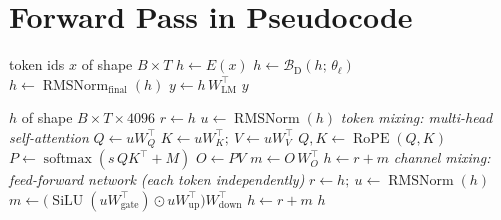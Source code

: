 \documentclass[10pt,a4paper]{article}
\newcommand{\op}[1]{\operatorname{#1}}
\theoremstyle{definition}
\begin{document}
\section{Forward Pass in Pseudocode}\label{sec:algo}
\begin{algorithm}[H]
\caption{Llama-3.1-8B-Instruct: full forward pass}
\begin{algorithmic}[1]
\Require token ids $x$ of shape $B\times T$
\State $h \gets E(x)$ 
 
\State $h \gets \mathcal{B}_{\mathrm{D}}(h;\,\theta_\ell)$ 
\EndFor
\State $h \gets \op{RMSNorm}_{\mathrm{final}}(h)$ 
\State $y \gets h\,W_{\mathrm{LM}}^{\top}$ 
\State \Return $y$ 
\end{algorithmic}
\end{algorithm}
\begin{algorithm}[H]
\caption{Block $\mathcal{B}_{\mathrm{D}}(h)$ --- Decoder block}
\begin{algorithmic}[1]
\Require $h$ of shape $B\times T\times 4096$
\State $r \gets h$ 
\State $u \gets \op{RMSNorm}(h)$ 
\Statex \hspace{-1.2em}\textit{token mixing: multi-head self-attention}
\State $Q \gets u W_Q^{\top}$ 
\State $K \gets u W_K^{\top};\ V \gets u W_V^{\top}$ 
\State $Q, K \gets \op{RoPE}(Q, K)$ 
\State $P \gets \op{softmax}(s\, Q K^{\top} + M)$ 
\State $O \gets P V$ 
\State $m \gets O\, W_O^{\top}$ 
\State $h \gets r + m$ 
\Statex \hspace{-1.2em}\textit{channel mixing: feed-forward network (each token independently)}
\State $r \gets h;\ u \gets \op{RMSNorm}(h)$
\State $m \gets \big(\op{SiLU}(u W_{\mathrm{gate}}^{\top}) \odot u W_{\mathrm{up}}^{\top}\big) W_{\mathrm{down}}^{\top}$ 
\State $h \gets r + m$ 
\State \Return $h$
\end{algorithmic}
\end{algorithm}
\end{document}
